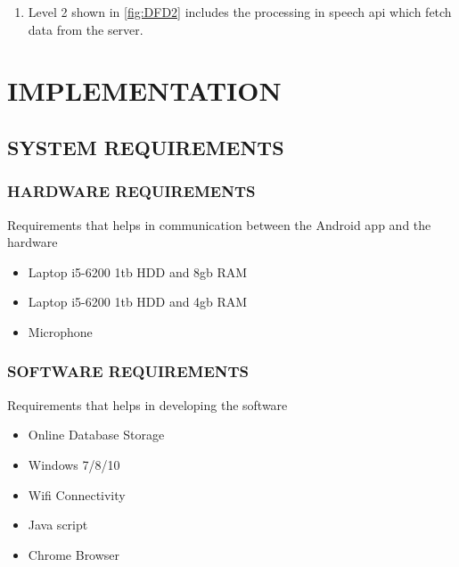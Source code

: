\documentclass[12pt]{report} %
\begin{document}
\begin{enumerate}
	\item Level 2 shown in \autoref{fig:DFD2} includes the processing in speech api which fetch data from the server.
\end{enumerate}

%


\chapter{IMPLEMENTATION}

\section{SYSTEM REQUIREMENTS}
\label{sec:SYSTEM REQUIREMENTS}


\subsection{HARDWARE REQUIREMENTS}
\label{subsec:HARDWARE REQUIREMENTS}
Requirements that helps in communication between the Android app and the hardware
\begin{itemize}
	\item Laptop i5-6200 1tb HDD and 8gb RAM
	\item Laptop i5-6200 1tb HDD and 4gb RAM
	\item Microphone
\end{itemize}

\subsection{SOFTWARE REQUIREMENTS}
\label{subsec:SOFTWARE REQUIREMENTS}
Requirements that helps in developing the software
\begin{itemize}
	\item Online Database Storage
	\item Windows 7/8/10
	\item Wifi Connectivity
	\item Java script
	\item Chrome Browser
\end{itemize}
\end{document}
